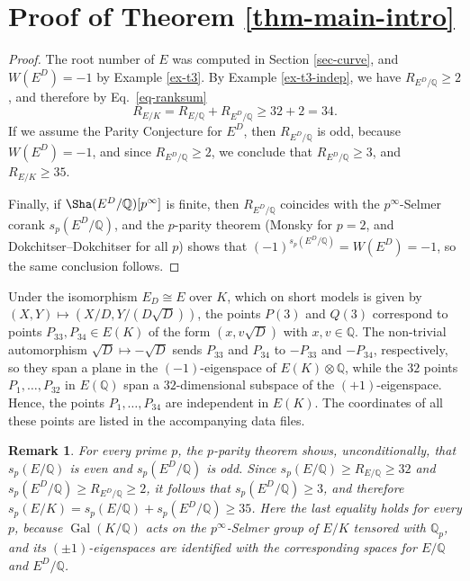 \documentclass[11pt]{amsart}
\newtheorem{remark}[defn]{Remark}
\newcommand{\Q}{\mathbb Q}
\DeclareMathOperator{\Gal}{Gal}
\begin{document}
\section{Proof of Theorem \ref{thm-main-intro}}\label{sec-proof}


\begin{proof}
The root number of $E$ was computed in Section \ref{sec-curve}, and $W(E^D)=-1$ by Example \ref{ex-t3}. By Example \ref{ex-t3-indep}, we have $R_{E^D/\Q}\geq 2$, and therefore by Eq.~\eqref{eq-ranksum}
$$R_{E/K}=R_{E/\Q}+R_{E^D/\Q}\geq 32+2=34.$$ 
If we assume the Parity Conjecture for $E^D$, then $R_{E^D/\Q}$ is odd, because $W(E^D)=-1$, and since $R_{E^D/\Q}\geq 2$, we conclude that $R_{E^D/\Q}\geq 3$, and $R_{E/K}\geq 35$. 

Finally, if $\Sha(E^D/\Q)[p^\infty]$ is finite, then $R_{E^D/\Q}$ coincides with the $p^\infty$-Selmer corank $s_p(E^D/\Q)$, and the $p$-parity theorem (Monsky \cite{monsky} for $p=2$, and Dokchitser--Dokchitser \cite{DD10} for all $p$) shows that $(-1)^{s_p(E^D/\Q)}=W(E^D)=-1$, so the same conclusion follows.
\end{proof}

Under the isomorphism $E_D\cong E$ over $K$, which on short models is given by $(X,Y)\mapsto(X/D,Y/(D\sqrt{D}))$, the points $P(3)$ and $Q(3)$ correspond to points $P_{33},P_{34}\in E(K)$ of the form $(x,v\sqrt{D})$ with $x,v\in\Q$. The non-trivial automorphism $\sqrt{D}\mapsto -\sqrt{D}$ sends $P_{33}$ and $P_{34}$ to $-P_{33}$ and $-P_{34}$, respectively, so they span a plane in the $(-1)$-eigenspace of $E(K)\otimes\Q$, while the $32$ points $P_1,\ldots,P_{32}$ in $E(\Q)$ span a $32$-dimensional subspace of the $(+1)$-eigenspace. Hence, the points $P_1,\ldots,P_{34}$ are independent in $E(K)$. The coordinates of all these points are listed in the accompanying data files.

\begin{remark}\label{rem-selmer}
For every prime $p$, the $p$-parity theorem shows, unconditionally, that $s_p(E/\Q)$ is even and $s_p(E^D/\Q)$ is odd. Since $s_p(E/\Q)\geq R_{E/\Q}\geq 32$ and $s_p(E^D/\Q)\geq R_{E^D/\Q}\geq 2$, it follows that $s_p(E^D/\Q)\geq 3$, and therefore $s_p(E/K)=s_p(E/\Q)+s_p(E^D/\Q)\geq 35$. Here the last equality holds for every $p$, because $\Gal(K/\Q)$ acts on the $p^\infty$-Selmer group of $E/K$ tensored with $\Q_p$, and its $(\pm1)$-eigenspaces are identified with the corresponding spaces for $E/\Q$ and $E^D/\Q$.
\end{remark}


\end{document}
